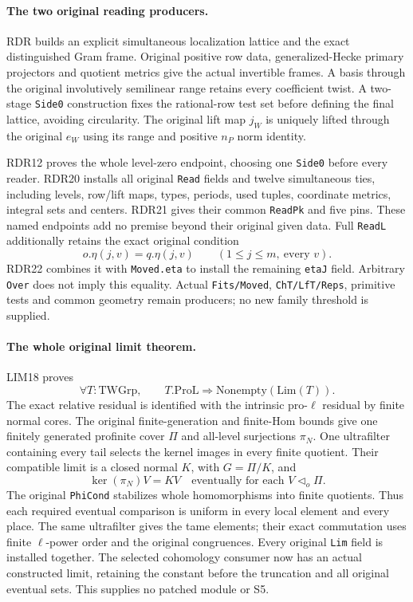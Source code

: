 \paragraph{The two original reading producers.}
RDR builds an explicit simultaneous localization lattice and
the exact distinguished Gram frame. Original positive row
data, generalized-Hecke primary projectors and quotient metrics
give the actual invertible frames. A basis through the original
involutively semilinear range retains every coefficient twist.
A two-stage \texttt{Side0} construction fixes the rational-row
test set before defining the final lattice, avoiding circularity.
The original lift map $j_W$ is uniquely lifted through the
original $e_W$ using its range and positive $n_P$ norm identity.

RDR12 proves the whole level-zero endpoint, choosing one
\texttt{Side0} before every reader. RDR20 installs all original
\texttt{Read} fields and twelve simultaneous ties, including
levels, row/lift maps, types, periods, used tuples, coordinate
metrics, integral sets and centers. RDR21 gives their common
\texttt{ReadPk} and five pins. These named endpoints add no
premise beyond their original given data. Full \texttt{ReadL}
additionally retains the exact original condition
\[
 o.\eta(j,v)=q.\eta(j,v)\qquad(1\le j\le m,\ \text{every }v).
\]
RDR22 combines it with \texttt{Moved.eta} to install the
remaining \texttt{etaJ} field. Arbitrary \texttt{Over} does
not imply this equality. Actual \texttt{Fits/Moved},
\texttt{ChT/LfT/Reps}, primitive tests and common geometry
remain producers; no new family threshold is supplied.

\paragraph{The whole original limit theorem.}
LIM18 proves
\[
 \forall T:\mathrm{TWGrp},\qquad
        T.\mathrm{ProL}\Longrightarrow\mathrm{Nonempty}(\mathrm{Lim}(T)).
\]
The exact relative residual is identified with the intrinsic
pro-$\ell$ residual by finite normal cores. The original
finite-generation and finite-Hom bounds give one finitely
generated profinite cover $\Pi$ and all-level surjections
$\pi_N$. One ultrafilter containing every tail selects the
kernel images in every finite quotient. Their compatible limit
is a closed normal $K$, with $G=\Pi/K$, and
\[
 \ker(\pi_N)V=KV
 \quad\text{eventually for each }V\triangleleft_o\Pi.
\]
The original \texttt{PhiCond} stabilizes whole homomorphisms
into finite quotients. Thus each required eventual comparison
is uniform in every local element and every place. The same
ultrafilter gives the tame elements; their exact commutation
uses finite $\ell$-power order and the original congruences.
Every original \texttt{Lim} field is installed together.
The selected cohomology consumer now has an actual constructed
limit, retaining the constant before the truncation and all
original eventual sets. This supplies no patched module or S5.

